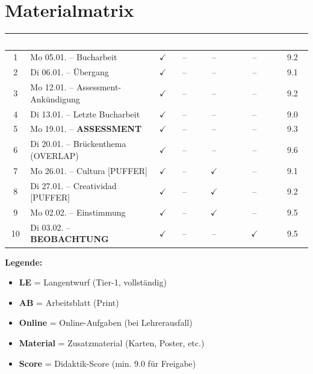 \documentclass[11pt, a4paper]{article}
\newcommand{\ja}{\textcolor{success}{\textbf{$\checkmark$}}}
\newcommand{\nein}{\textcolor{grau}{--}}
\begin{document}
\newpage


\section*{Materialmatrix}

\begin{center}
\small
\begin{tabular}{|c|l|c|c|c|c|c|}
\hline
\rowcolor{spanisch}
\textcolor{white}{\textbf{DS}} &
\textcolor{white}{\textbf{Datum / Thema}} &
\textcolor{white}{\textbf{LE}} &
\textcolor{white}{\textbf{AB}} &
\textcolor{white}{\textbf{Online}} &
\textcolor{white}{\textbf{Material}} &
\textcolor{white}{\textbf{Score}} \\
\hline
\hline
1 & Mo 05.01. -- Bucharbeit & \ja & \nein & \nein & \nein & 9.2 \\
\hline
2 & Di 06.01. -- Übergang & \ja & \nein & \nein & \nein & 9.1 \\
\hline
3 & Mo 12.01. -- Assessment-Ankündigung & \ja & \nein & \nein & \nein & 9.2 \\
\hline
4 & Di 13.01. -- Letzte Bucharbeit & \ja & \nein & \nein & \nein & 9.0 \\
\hline
\rowcolor{spanisch!10}
5 & Mo 19.01. -- \textbf{ASSESSMENT} & \ja & \nein & \nein & \nein & 9.3 \\
\hline
\rowcolor{spanisch!10}
6 & Di 20.01. -- Brückenthema (OVERLAP) & \ja & \nein & \nein & \nein & 9.6 \\
\hline
\rowcolor{warning!10}
7 & Mo 26.01. -- Cultura [PUFFER] & \ja & \nein & \ja & \nein & 9.1 \\
\hline
\rowcolor{warning!10}
8 & Di 27.01. -- Creatividad [PUFFER] & \ja & \nein & \ja & \nein & 9.2 \\
\hline
9 & Mo 02.02. -- Einstimmung & \ja & \nein & \ja & \nein & 9.5 \\
\hline
\rowcolor{spanisch!10}
10 & Di 03.02. -- \textbf{BEOBACHTUNG} & \ja & \nein & \nein & \ja & 9.5 \\
\hline
\end{tabular}
\end{center}

\vspace{0.5cm}

\textbf{Legende:}
\begin{itemize}[leftmargin=2em]
    \item \textbf{LE} = Langentwurf (Tier-1, vollständig)
    \item \textbf{AB} = Arbeitsblatt (Print)
    \item \textbf{Online} = Online-Aufgaben (bei Lehrerausfall)
    \item \textbf{Material} = Zusatzmaterial (Karten, Poster, etc.)
    \item \textbf{Score} = Didaktik-Score (min. 9.0 für Freigabe)
\end{itemize}
\end{document}

